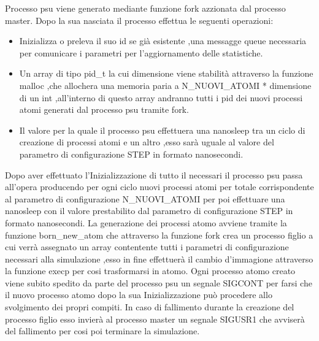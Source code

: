 Processo psu viene generato mediante funzione fork azzionata dal processo master.
Dopo la sua nasciata il processo effettua le seguenti operazioni:
\begin{itemize}
    \item Inizializza o preleva il suo id se già esistente ,una messagge queue necessaria per comunicare i parametri per l'aggiornamento delle statistiche. 
    \item Un array di tipo pid_t la cui dimensione viene stabilità attraverso la funzione malloc ,che allochera una memoria paria a N\_NUOVI\_ATOMI * dimensione di un int ,all'interno di questo array andranno tutti i pid dei nuovi processi atomi generati dal processo psu tramite fork. 
    \item Il valore per la quale il processo psu effettuera una nanosleep tra un ciclo di creazione di processi atomi e un altro ,esso sarà uguale al valore del parametro di configurazione STEP in formato nanosecondi.
\end{itemize}
Dopo aver effettuato l'Inizializzazione di tutto il necessari il processo psu passa all'opera producendo per ogni ciclo nuovi processi atomi per totale corrispondente al parametro di configurazione N\_NUOVI\_ATOMI per poi effettuare una nanosleep con il valore prestabilito dal parametro di configurazione STEP in formato nanosecondi.
La generazione dei processi atomo avviene tramite la funzione born_new_atom che attraverso la funzione fork crea un processo figlio a cui verrà assegnato un array contentente tutti i parametri di configurazione necessari alla simulazione ,esso in fine effettuerà il cambio d'immagione attraverso la funzione execp per cosi trasformarsi in atomo.
Ogni processo atomo creato viene subito spedito da parte del processo psu un segnale SIGCONT per farsi che il nuovo processo atomo dopo la sua Inizializzazione può procedere allo svolgimento dei propri compiti. 
In caso di fallimento durante la creazione del processo figlio esso invierà al processo master un segnale SIGUSR1 che avviserà del fallimento per cosi poi terminare la simulazione. 